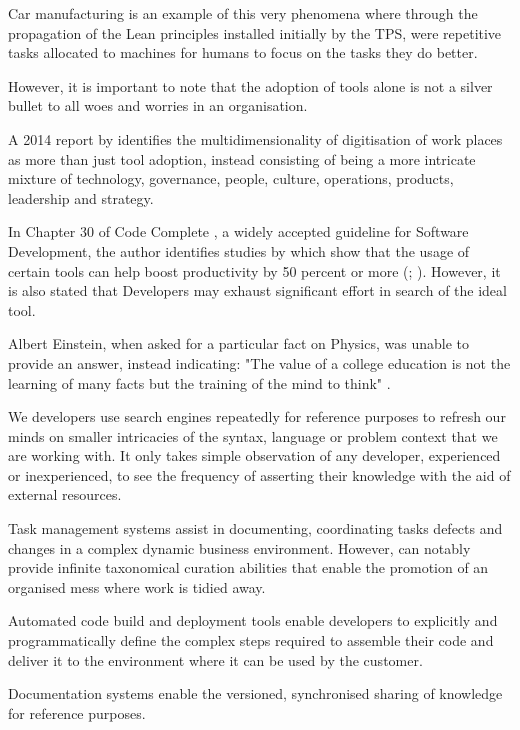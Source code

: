 Car manufacturing is an example of this very phenomena where through the propagation of the Lean principles installed initially by the TPS, were repetitive tasks allocated to machines for humans to focus on the tasks they do better.%

However, it is important to note that the adoption of tools alone is not a silver bullet to all woes and worries in an organisation. 

A 2014 report by \citeauthor{azhari2014digital} identifies the multidimensionality of digitisation of work places as more than just tool adoption, instead consisting of being a more intricate mixture of technology, governance, people, culture, operations, products, leadership and strategy.

In Chapter 30 of Code Complete \parencite{codeComplete}, a widely accepted guideline for Software Development, the author identifies studies by which show that the usage of certain tools can help boost productivity by 50 percent or more (\cite{jones2000software}; \citeauthor{boehm2000software} \citeyear{boehm2000software}). However, it is also stated that Developers may exhaust significant effort in search of the ideal tool. 

Albert Einstein, when asked for a particular fact on Physics, was unable to provide an answer, instead indicating: "The value of a college education is not the learning of many facts but the training of the mind to think"  \parencite{einstein2011ultimate}.

We developers use search engines repeatedly for reference purposes to refresh our minds on smaller intricacies of the syntax, language or problem context that we are working with. It only takes simple observation of any developer, experienced or inexperienced, to see the frequency of asserting their knowledge with the aid of external resources.

Task management systems assist in documenting, coordinating tasks defects and changes in a complex dynamic business environment. However, can notably provide infinite taxonomical curation abilities that enable the promotion of an organised mess where work is tidied away.

Automated code build and deployment tools enable developers to explicitly and programmatically define the complex steps required to assemble their code and deliver it to the environment where it can be used by the customer. 

Documentation systems enable the versioned, synchronised sharing of knowledge for reference purposes. 

